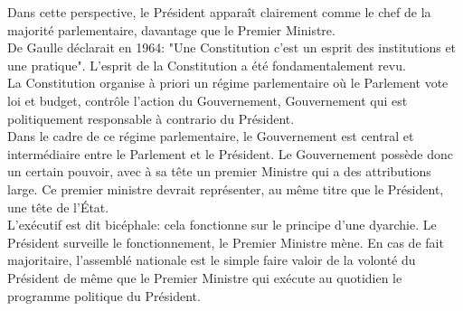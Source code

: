 \documentclass[12pt, a4paper, openany]{book}
\begin{document}
Dans cette perspective, le Président apparaît clairement comme le chef de la majorité parlementaire, davantage que le Premier Ministre. \\
De Gaulle déclarait en 1964: "Une Constitution c'est un esprit des institutions et une pratique". L'esprit de la Constitution a été fondamentalement revu. \\
La Constitution organise à priori un régime parlementaire où le Parlement vote loi et budget, contrôle l'action du Gouvernement, Gouvernement qui est politiquement responsable à contrario du Président. \\
Dans le cadre de ce régime parlementaire, le Gouvernement est central et intermédiaire entre le Parlement et le Président. Le Gouvernement possède donc un certain pouvoir, avec à sa tête un premier Ministre qui a des attributions large. Ce premier ministre devrait représenter, au même titre que le Président, une tête de l'État. \\
L'exécutif est dit bicéphale: cela fonctionne sur le principe d'une dyarchie. Le Président surveille le fonctionnement, le Premier Ministre mène. En cas de fait majoritaire, l'assemblé nationale est le simple faire valoir de la volonté du Président de même que le Premier Ministre qui exécute au quotidien le programme politique du Président.
\end{document}
